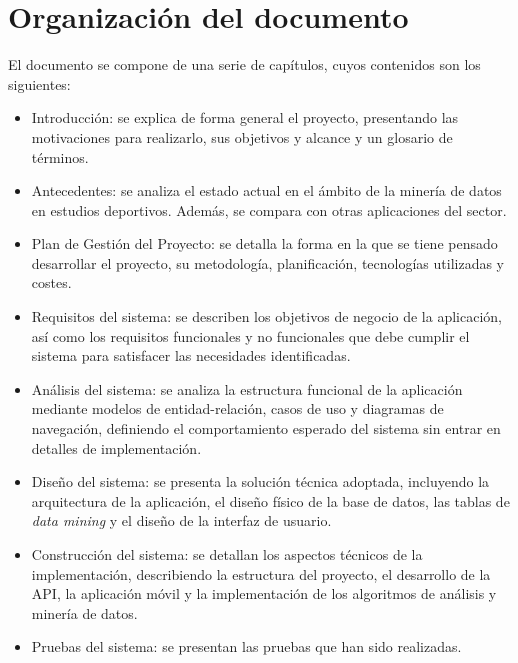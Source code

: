 \section{Organización del documento}
El documento se compone de una serie de capítulos, cuyos contenidos son los siguientes:
\begin{itemize}
    \item Introducción: se explica de forma general el proyecto, presentando las motivaciones para realizarlo, sus objetivos y alcance y un glosario de términos.
    \item Antecedentes: se analiza el estado actual en el ámbito de la minería de datos en estudios deportivos. Además, se compara con otras aplicaciones del sector.
    \item Plan de Gestión del Proyecto: se detalla la forma en la que se tiene pensado desarrollar el proyecto, su metodología, planificación, tecnologías utilizadas y costes.
      \item Requisitos del sistema: se describen los objetivos de negocio de la aplicación, así como los requisitos funcionales y no funcionales que debe cumplir el sistema para satisfacer las necesidades identificadas.
    \item Análisis del sistema: se analiza la estructura funcional de la aplicación mediante modelos de entidad-relación, casos de uso y diagramas de navegación, definiendo el comportamiento esperado del sistema sin entrar en detalles de implementación.
    \item Diseño del sistema: se presenta la solución técnica adoptada, incluyendo la arquitectura de la aplicación, el diseño físico de la base de datos, las tablas de \textit{data mining} y el diseño de la interfaz de usuario.
    \item Construcción del sistema: se detallan los aspectos técnicos de la implementación, describiendo la estructura del proyecto, el desarrollo de la API, la aplicación móvil y la implementación de los algoritmos de análisis y minería de datos.
    \item Pruebas del sistema: se presentan las pruebas que han sido realizadas.
\end{itemize}




